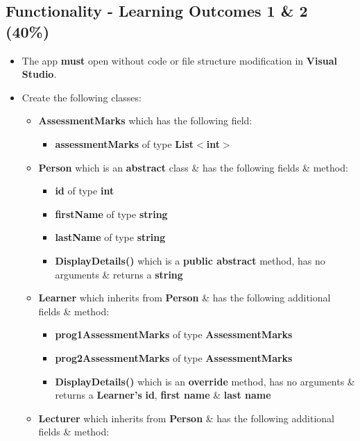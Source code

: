 \documentclass{article}
\begin{document}
\subsection*{Functionality - Learning Outcomes 1 \& 2 (40\%)}
\begin{itemize}
    \item The app \textbf{must} open without code or file structure modification in \textbf{Visual Studio}.
    \item Create the following classes:
    \begin{itemize}
        \item \textbf{AssessmentMarks} which has the following field:
        \begin{itemize}
            \item \textbf{assessmentMarks} of type \textbf{List$<$int$>$}
        \end{itemize}
        \item \textbf{Person} which is an \textbf{abstract} class \& has the following fields \& method:
        \begin{itemize}
            \item \textbf{id} of type \textbf{int}
            \item \textbf{firstName} of type \textbf{string}
            \item \textbf{lastName} of type \textbf{string}
            \item \textbf{DisplayDetails()} which is a \textbf{public abstract} method, has no arguments \& returns a \textbf{string}
        \end{itemize}    
        \item \textbf{Learner} which inherits from \textbf{Person} \& has the following additional fields \& method:
        \begin{itemize}
            \item \textbf{prog1AssessmentMarks} of type \textbf{AssessmentMarks}
            \item \textbf{prog2AssessmentMarks} of type \textbf{AssessmentMarks}
            \item \textbf{DisplayDetails()} which is an \textbf{override} method, has no arguments \& returns a \textbf{Learner's} \textbf{id}, \textbf{first name} \& \textbf{last name}
        \end{itemize}
        \item \textbf{Lecturer} which inherits from \textbf{Person} \& has the following additional fields \& method:
        \begin{itemize}

\end{itemize}
\end{itemize}
\end{itemize}
\end{document}
